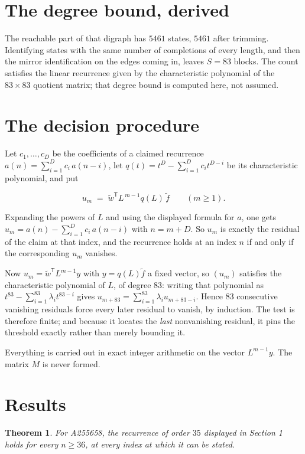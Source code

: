 \documentclass[11pt]{article}
\newtheorem{theorem}{Theorem}
\theoremstyle{definition}
\begin{document}
\section{The degree bound, derived}

The reachable part of that digraph has $5461$ states, $5461$ after trimming. Identifying states with the same number of completions of every length, and then the mirror identification on the edges coming in, leaves $S = 83$ blocks. The count satisfies the linear recurrence given by the characteristic polynomial of the $83\times83$ quotient matrix; that degree bound is computed here, not assumed.

\section{The decision procedure}

Let $c_1,\dots,c_D$ be the coefficients of a claimed recurrence $a(n) = \sum_{i=1}^{D} c_i\,a(n-i)$, let $q(t) = t^{D} - \sum_{i=1}^{D} c_i t^{D-i}$ be its characteristic polynomial, and put

\[u_m \;=\; \tilde w^{\mathsf T} L^{\,m-1} q(L)\,\tilde f \qquad (m \ge 1).\]

Expanding the powers of $L$ and using the displayed formula for $a$, one gets $u_m = a(n) - \sum_{i=1}^{D} c_i\,a(n-i)$ with $n = m + D$. So $u_m$ is exactly the residual of the claim at that index, and the recurrence holds at an index $n$ if and only if the corresponding $u_m$ vanishes.

Now $u_m = \tilde w^{\mathsf T} L^{m-1} y$ with $y = q(L)\tilde f$ a fixed vector, so $(u_m)$ satisfies the characteristic polynomial of $L$, of degree $83$: writing that polynomial as $t^{83} - \sum_{i=1}^{83} \lambda_i t^{83-i}$ gives $u_{m+83} = \sum_{i=1}^{83} \lambda_i u_{m+83-i}$. Hence $83$ consecutive vanishing residuals force every later residual to vanish, by induction. The test is therefore finite; and because it locates the {\itshape last} nonvanishing residual, it pins the threshold exactly rather than merely bounding it.

Everything is carried out in exact integer arithmetic on the vector $L^{m-1}y$. The matrix $M$ is never formed.

\section{Results}

\begin{theorem} For A255658, the recurrence of order $35$ displayed in Section 1 holds for every $n \ge 36$, at every index at which it can be stated.\end{theorem}
\end{document}
